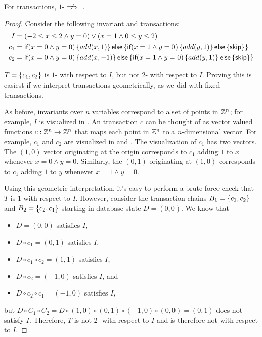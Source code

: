 \begin{claim}\label{clm:imp-1-iconfluence}
  For \imp{} transactions, $1$-\iconfluence $\centernot \implies$ \iconfluence.
\end{claim}
\begin{proof}
  Consider the following invariant and \imp{} transactions:
  \begin{align*}
    I &= (-2 \leq x \leq 2 \land y = 0) \lor (x = 1 \land 0 \leq y \leq 2) \\
    c_1 &= \textsf{if}(x = 0 \land y = 0)\left\{
      add(x, 1)
    \right\}\textsf{else}\left\{\textsf{if}(x = 1 \land y = 0)\left\{
      add(y, 1)
    \right\}\textsf{else}\left\{
      \textsf{skip}
    \right\}\right\} \\
    c_2 &= \textsf{if}(x = 0 \land y = 0)\left\{
      add(x, -1)
    \right\}\textsf{else}\left\{\textsf{if}(x = 1 \land y = 0)\left\{
      add(y, 1)
    \right\}\textsf{else}\left\{
      \textsf{skip}
    \right\}\right\}
  \end{align*}

  $T = \left\{c_1, c_2\right\}$ is $1$-\iconfluent{} with respect to $I$, but not
  $2$-\iconfluent{} with respect to $I$. Proving this is easiest if we
  interpret \imp{} transactions geometrically, as we did with fixed
  transactions.

  As before, invariants over $n$ variables correspond to a set of points in
  $\mathbb{Z}^n$; for example, $I$ is visualized in . An \imp{}
  transaction $c$ can be thought of as vector valued functions $c: \mathbb{Z}^n \to
  \mathbb{Z}^n$ that maps each point in $\mathbb{Z}^n$ to a $n$-dimensional vector. For
  example, $c_1$ and $c_2$ are visualized in  and .
  The visualization of $c_1$ has two vectors. The $(1, 0)$ vector originating
  at the origin corresponds to $c_1$ adding $1$ to $x$ whenever $x = 0 \land y
  = 0$. Similarly, the $(0, 1)$ originating at $(1, 0)$ corresponds to $c_1$
  adding $1$ to $y$ whenever $x = 1 \land y = 0$.

  Using this geometric interpretation, it's easy to perform a brute-force check
  that $T$ is $1$-\iconfluent with respect to $I$. However, consider the
  transaction chains $B_1 = \left\{c_1, c_2\right\}$ and $B_2 = \left\{c_2, c_1\right\}$ starting
  in database state $D = (0, 0)$. We know that
  \begin{itemize}
    \item $D = (0, 0)$ satisfies $I$,
    \item $D \circ c_1 = (0, 1)$ satisfies $I$,
    \item $D \circ c_1 \circ c_2 = (1, 1)$ satisfies $I$,
    \item $D \circ c_2 = (-1, 0)$ satisfies $I$, and
    \item $D \circ c_2 \circ c_1 = (-1, 0)$ satisfies $I$,
  \end{itemize}
  but $D \circ C_1 \circ C_2 = D \circ (1, 0) \circ (0, 1) \circ (-1, 0) \circ
  (0, 0) = (0, 1)$ does not satisfy $I$. Therefore, $T$ is not 2-\iconfluent
  with respect to $I$ and is therefore not \iconfluent with respect to $I$.
\end{proof}

